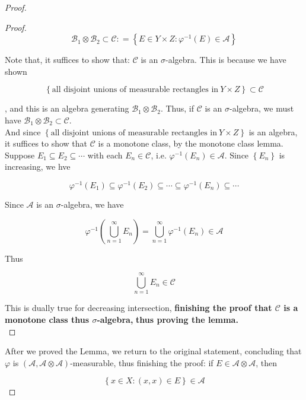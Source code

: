 \begin{proof}
\begin{proof}
\[\mathcal{B}_{1} \otimes \mathcal{B}_{2} \subset \mathcal{C}: = \left\{ {E \in Y \times Z:\varphi^{- 1}(E) \in \mathcal{A}} \right\}\]

Note that, it suffices to show that: \(\mathcal{C}\) is an \(\sigma\)-algebra. This is because we have shown

\[\left\{ {\text{all disjoint unions of measurable rectangles in}\ Y \times Z} \right\} \subset \mathcal{C}\]

, and this is an algebra generating \(\mathcal{B}_{1} \otimes \mathcal{B}_{2}\). Thus, if \(\mathcal{C}\) is an \(\sigma\)-algebra, we must have \(\mathcal{B}_{1} \otimes \mathcal{B}_{2} \subset \mathcal{C}\).\\
And since \(\left\{ {\text{all disjoint unions of measurable rectangles in}\ Y \times Z} \right\}\) is an algebra, it suffices to show that \(\mathcal{C}\) is a monotone class, by the monotone class lemma.\\
Suppose \(E_{1} \subseteq E_{2} \subseteq \cdots\) with each \(E_{n} \in \mathcal{C}\), i.e. \(\varphi^{- 1}(E_{n}) \in \mathcal{A}\). Since \(\left\{ E_{n} \right\}\) is increasing, we hve

\[\varphi^{- 1}(E_{1}) \subseteq \varphi^{- 1}(E_{2}) \subseteq \cdots \subseteq \varphi^{- 1}(E_{n}) \subseteq \cdots\]

Since \(\mathcal{A}\) is an \(\sigma\)-algebra, we have

\[\varphi^{- 1}(\bigcup\limits_{n = 1}^{\infty}E_{n}) = \bigcup\limits_{n = 1}^{\infty}\varphi^{- 1}(E_{n}) \in \mathcal{A}\]

Thus

\[\bigcup\limits_{n = 1}^{\infty}E_{n} \in \mathcal{C}\]

This is dually true for decreasing intersection, \textbf{finishing the proof that \(\mathcal{C}\) is a monotone class thus \(\sigma\)-algebra,} \textbf{thus proving the lemma.}\\

\end{proof}

After we proved the Lemma, we return to the original statement, concluding that \(\varphi\) is \((\mathcal{A},\mathcal{A} \otimes \mathcal{A})\)-measurable, thus finishing the proof: if \(E \in \mathcal{A} \otimes \mathcal{A}\), then

\[\left\{ {x \in X:(x,x) \in E} \right\} \in \mathcal{A}\]

\end{proof}

